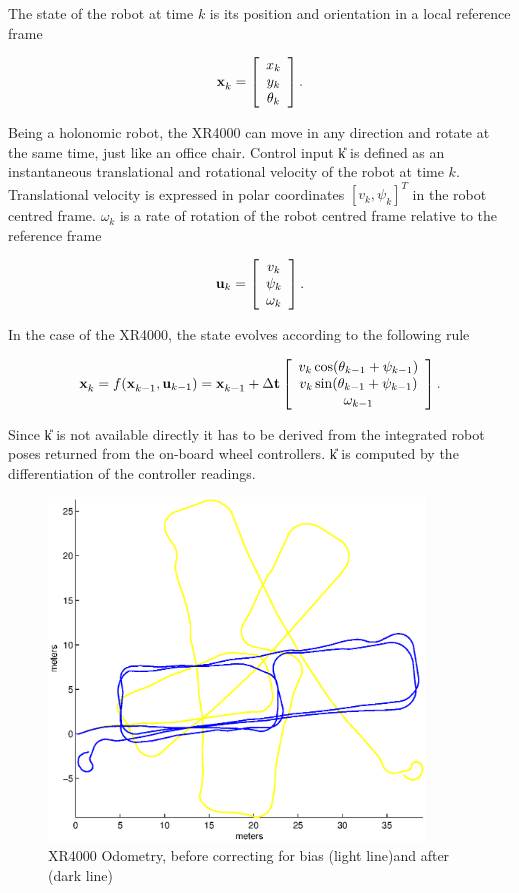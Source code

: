The state of the robot at time $k$ is its position and orientation in a
local reference frame

$$
\x{k}{}{} = \left[\begin{array}{c} 
    x_k \\ 
    y_k \\ 
    \theta_k
  \end{array}\right].
$$

Being a holonomic robot, the XR4000 can move in any direction and rotate
at the same time, just like an office chair. Control input \U{k} is
defined as an instantaneous translational and rotational velocity of the
robot at time $k$. Translational velocity is expressed in polar
coordinates $[v_k,\psi_k]^T$ in the robot centred frame. $\omega_k$ is a
rate of rotation of the robot centred frame relative to the reference
frame

$$
{\bf u}_{k} = \left[\begin{array}{c} v_k\\ \psi_k \\ \omega_k \end{array} \right].
$$

In the case of the XR4000, the state evolves according to the following
rule

$$
\x{k}{}{} = f(\x{k-1}{}{} ,\U{k-1}) = \x{k-1}{}{} + \Delta {\bf t}
\Vector{v_k\cos(\theta_{k-1} + \psi_{k-1})\\
v_k\sin(\theta_{k-1} + \psi_{k-1})\\
\omega_{k-1}}.
$$

Since \U{k} is not available directly it has to be derived from the
integrated robot poses returned from the on-board wheel controllers.
\U{k} is computed by the differentiation of the controller readings.

\begin{figure}[htbp]
  \centering

  \includegraphics[width=10cm]{Pics/xr4000_raw_odo}
  
  \caption[XR4000 odometry bias]
     {XR4000 Odometry, before correcting for bias (light line)and after (dark line)}
  \label{fig:xr4000_raw_odo}
\end{figure}

